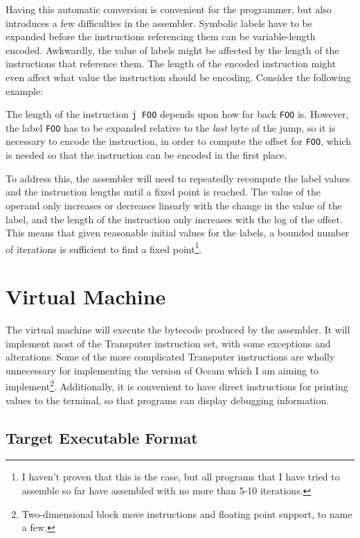 Having this automatic conversion is convenient for the programmer, but also
introduces a few difficulties in the assembler. Symbolic labels have to be
expanded before the instructions referencing them can be variable-length
encoded. Awkwardly, the value of labels might be affected by the length of
the instructions that reference them. The length of the encoded instruction
might even affect what value the instruction should be encoding.
Consider the following example:



The length of the instruction \texttt{j FOO} depends upon how far back
\texttt{FOO} is. However, the label \texttt{FOO} has to be expanded relative to
the \textit{last} byte of the jump, so it is necessary to encode the
instruction, in order to compute the offset for \texttt{FOO}, which is needed so
that the instruction can be encoded in the first place.

To address this, the assembler will need to repeatedly recompute the label
values and the instruction lengths until a fixed point is reached. The value of
the operand only increases or decreases linearly with the change in the value of
the label, and the length of the instruction only increases with the log of the
offset. This means that given reasonable initial values for the labels, a
bounded number of iterations is sufficient to find a fixed point\footnote{I
haven't proven that this is the case, but all programs that I have tried to
assemble so far have assembled with no more than 5-10 iterations.}.

\section{Virtual Machine}

The virtual machine will execute the bytecode produced by the assembler. It will
implement most of the Transputer instruction set, with some exceptions and
alterations. Some of the more complicated Transputer instructions are wholly
unnecessary for implementing the version of Occam which I am aiming to
implement\footnote{Two-dimensional block move instructions and floating point
support, to name a few.}. Additionally, it is convenient to have direct
instructions for printing values to the terminal, so that programs can display
debugging information.

\subsection{Target Executable Format} \label{binary-format}

